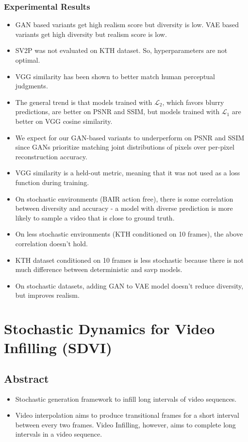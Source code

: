 \documentclass{article}
\begin{document}
    \subsubsection{Experimental Results}\label{subsubsec:Stochastic_Adversarial_Video_Prediction_(SAVP):experimental-results}
    \begin{itemize}
        \item GAN based variants get high realism score but diversity is low.
        VAE based variants get high diversity but realism score is low.
        \item SV2P was not evaluated on KTH dataset.
        So, hyperparameters are not optimal.
        \item VGG similarity has been shown to better match human perceptual judgments.
        \item The general trend is that models trained with $\mathcal{L}_2$, which favors blurry predictions, are better on PSNR and SSIM, but models trained with $\mathcal{L}_1$ are better on VGG cosine similarity.
        \item We expect for our GAN-based variants to underperform on PSNR and SSIM since GANs prioritize matching joint distributions of pixels over per-pixel reconstruction accuracy.
        \item VGG similarity is a held-out metric, meaning that it was not used as a loss function during training.
        \item On stochastic environments (BAIR action free), there is some correlation between diversity and accuracy - a model with diverse prediction is more likely to sample a video that is close to ground truth.
        \item On less stochastic environments (KTH conditioned on 10 frames), the above correlation doesn't hold.
        \item KTH dataset conditioned on 10 frames is less stochastic because there is not much difference between deterministic and savp models.
        \item On stochastic datasets, adding GAN to VAE model doesn't reduce diversity, but improves realism.
    \end{itemize}
    \newpage


    \section{Stochastic Dynamics for Video Infilling (SDVI)}\label{sec:Stochastic_Dynamics_for_Video_Infilling_(SDVI)}
    \subsection*{Abstract}
    \begin{itemize}
        \item Stochastic generation framework to infill long intervals of video sequences.
        \item Video interpolation aims to produce transitional frames for a short interval between every two frames.
        Video Infilling, however, aims to complete long intervals in a video sequence.
    \end{itemize}
\end{document}
